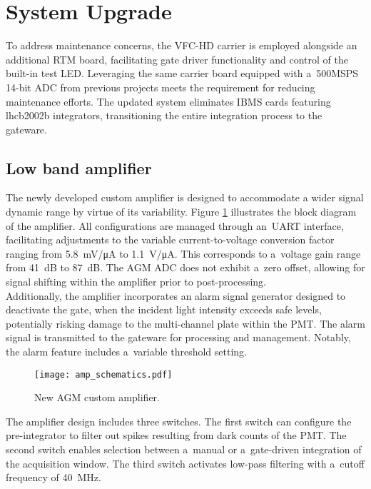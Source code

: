 \section{System Upgrade}
To address maintenance concerns, the VFC-HD carrier is employed alongside an
additional RTM board, facilitating gate driver functionality and control of the
built-in test LED. Leveraging the same carrier board equipped with a~500MSPS
14-bit ADC from previous projects meets the requirement for reducing
maintenance efforts. The updated system eliminates IBMS cards featuring
lhcb2002b integrators, transitioning the entire integration process to the
gateware.

\subsection{Low band amplifier}
The newly developed custom amplifier is designed to accommodate a wider signal
dynamic range by virtue of its variability.
Figure \ref{fig:amp_schematics} illustrates the block diagram of the amplifier.
All configurations are managed through an~UART interface, facilitating
adjustments to the variable current-to-voltage conversion factor ranging from
\SI{5.8}{mV/\micro A} to \SI{1.1}{V/\micro A}. This corresponds to a~voltage
gain range from \SI{41}{dB} to \SI{87}{dB}. The AGM ADC does not exhibit a~zero
offset, allowing for signal shifting within the amplifier prior to
post-processing.\\
Additionally, the amplifier incorporates an alarm signal generator designed to
deactivate the gate, when the incident light intensity exceeds safe levels,
potentially risking damage to the multi-channel plate within the PMT. The alarm
signal is transmitted to the gateware for processing and management. Notably,
the alarm feature includes a~variable threshold setting.
\begin{figure}[!tbh]
    \centering
    \texttt{[image: amp\_schematics.pdf]}
    \caption{New AGM custom amplifier.}
    \label{fig:amp_schematics}
\end{figure}
The amplifier design includes three switches. The first switch can configure
the pre-integrator to filter out spikes resulting from dark counts of the PMT.
The second switch enables selection between a~manual or a~gate-driven integration
of the acquisition window. The third switch activates low-pass filtering with a~cutoff frequency of \SI{40}{MHz}.

